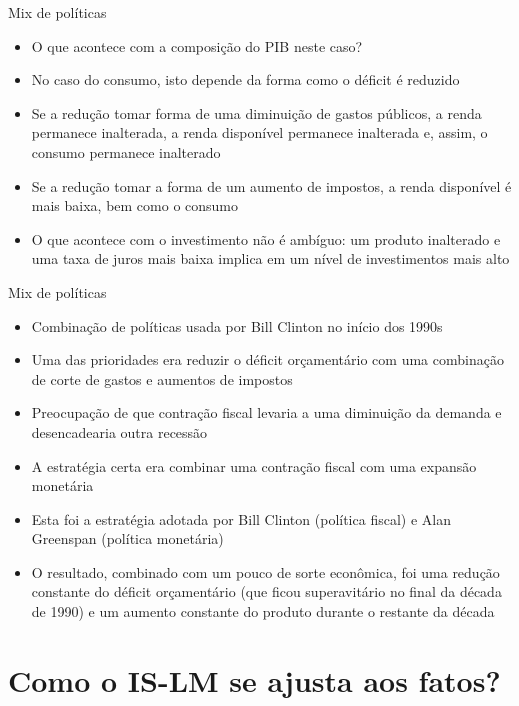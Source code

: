 \documentclass[10pt]{beamer}
\begin{document}
\begin{frame}{Mix de políticas}
\begin{itemize}
    \item O que acontece com a composição do PIB neste caso?
    \bigskip
    \item No caso do consumo, isto depende da forma como o déficit é reduzido
    \bigskip
    \item Se a redução tomar forma de uma diminuição de gastos públicos, a renda permanece inalterada, a renda disponível permanece inalterada e, assim, o consumo permanece inalterado
    \bigskip
    \item Se a redução tomar a forma de um aumento de impostos, a renda disponível é mais baixa, bem como o consumo
    \bigskip
    \item O que acontece com o investimento não é ambíguo: um produto inalterado e uma taxa de juros mais baixa implica em um nível de investimentos mais alto
\end{itemize}
\end{frame}

\begin{frame}{Mix de políticas}
\begin{itemize}
    \item Combinação de políticas usada por Bill Clinton no início dos 1990s
    \bigskip
    \item Uma das prioridades era reduzir o déficit orçamentário com uma combinação de corte de gastos e aumentos de impostos
    \bigskip
    \item Preocupação de que contração fiscal levaria a uma diminuição da demanda e desencadearia outra recessão
    \bigskip
    \item A estratégia certa era combinar uma contração fiscal com uma expansão monetária
    \bigskip
    \item Esta foi a estratégia adotada por Bill Clinton (política fiscal) e Alan Greenspan (política monetária)
    \bigskip
    \item O resultado, combinado com um pouco de sorte econômica, foi uma redução constante do déficit orçamentário (que ficou superavitário no final da década de 1990) e um aumento constante do produto durante o restante da década
\end{itemize}
\end{frame}

\section{Como o IS-LM se ajusta aos fatos?}
\end{document}
